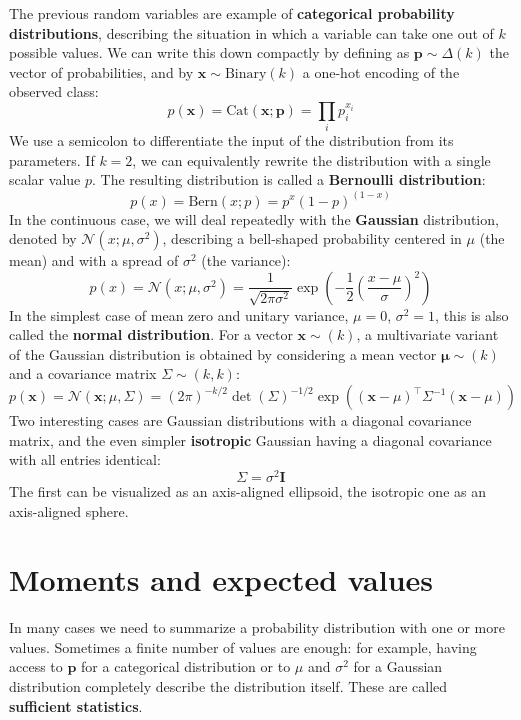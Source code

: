 The previous random variables are example of \textbf{categorical probability distributions}, describing the situation in which a variable can take one out of $k$ possible values. We can write this down compactly by defining as $\mathbf{p} \sim \Delta(k)$ the vector of probabilities, and by $\mathbf{x} \sim \text{Binary}(k)$ a one-hot encoding of the observed class:
%
$$
p(\mathbf{x})=\text{Cat}(\mathbf{x}; \mathbf{p})=\prod_ip_i^{x_i}
$$
%
We use a semicolon to differentiate the input of the distribution from its parameters. If $k=2$, we can equivalently rewrite the distribution with a single scalar value $p$. The resulting distribution is called a \textbf{Bernoulli distribution}:
%
$$
p(x)=\text{Bern}(x; p)= p^x(1-p)^{(1-x)}
$$
%
In the continuous case, we will deal repeatedly with the \textbf{Gaussian} distribution, denoted by $\mathcal{N}(x; \mu, \sigma^2)$, describing a bell-shaped probability centered in $\mu$ (the mean) and with a spread of $\sigma^2$ (the variance):
%
$$
p(x)=\mathcal{N}(x;\mu,\sigma^2)= \frac{1}{\sqrt{2\pi \sigma^2}}\exp\left(-\frac{1}{2}\left(\frac{x-\mu}{\sigma}\right)^2\right)
$$
%
In the simplest case of mean zero and unitary variance, $\mu=0$, $\sigma^2=1$, this is also called the \textbf{normal distribution}. For a vector $\mathbf{x} \sim (k)$, a multivariate variant of the Gaussian distribution is obtained by considering a mean vector $\mathbf{\mu} \sim (k)$ and a covariance matrix $\Sigma \sim (k,k)$:
%
$$
p(\mathbf{x})=\mathcal{N}(\mathbf{x};\mu, \Sigma)= \left(2\pi\right)^{-k/2}\det(\Sigma)^{-1/2}\exp\left((\mathbf{x}-\mu)^\top\Sigma^{-1}(\mathbf{x}-\mu)\right)
$$
%
Two interesting cases are Gaussian distributions with a diagonal covariance matrix, and the even simpler \textbf{isotropic} Gaussian having a diagonal covariance with all entries identical:
%
$$
\Sigma=\sigma^2\mathbf{I}
$$
%
The first can be visualized as an axis-aligned ellipsoid, the isotropic one as an axis-aligned sphere.

\section{Moments and expected values}

In many cases we need to summarize a probability distribution with one or more values. Sometimes a finite number of values are enough: for example, having access to $\mathbf{p}$ for a categorical distribution or to $\mu$ and $\sigma^2$ for a Gaussian distribution completely describe the distribution itself. These are called \textbf{sufficient statistics}. 

